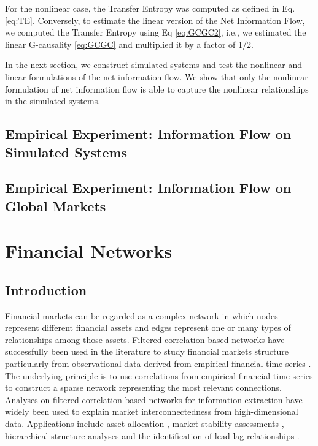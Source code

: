 \documentclass[]{book}
\theoremstyle{definition}
\theoremstyle{definition}
\theoremstyle{definition}
\theoremstyle{remark}
\begin{document}
For the nonlinear case, the Transfer Entropy was computed as defined in
Eq. \eqref{eq:TE}. Conversely, to estimate the linear version of the Net
Information Flow, we computed the Transfer Entropy using Eq
\eqref{eq:GCGC2}, i.e., we estimated the linear G-causality
\eqref{eq:GCGC} and multiplied it by a factor of 1/2.

In the next section, we construct simulated systems and test the
nonlinear and linear formulations of the net information flow. We show
that only the nonlinear formulation of net information flow is able to
capture the nonlinear relationships in the simulated systems.

\section{Empirical Experiment: Information Flow on Simulated
Systems}\label{empirical-experiment-information-flow-on-simulated-systems}

\section{Empirical Experiment: Information Flow on Global
Markets}\label{empirical-experiment-information-flow-on-global-markets}

\chapter{Financial Networks}\label{financial-networks}

\section{Introduction}\label{introduction-3}

Financial markets can be regarded as a complex network in which nodes
represent different financial assets and edges represent one or many
types of relationships among those assets. Filtered correlation-based
networks have successfully been used in the literature to study
financial markets structure particularly from observational data derived
from empirical financial time series
\cite{bardoscia2017pathways, 10.1371/journal.pone.0017994, Mantegna1999, aste2010correlation, Tumminello201040, Tumminello26072005}.
The underlying principle is to use correlations from empirical financial
time series to construct a sparse network representing the most relevant
connections. Analyses on filtered correlation-based networks for
information extraction \cite{song2008analysis,aste2010correlation} have
widely been used to explain market interconnectedness from
high-dimensional data. Applications include asset allocation
\cite{LI2018, pozzi2013spread}, market stability assessments
\cite{morales2012dynamical}, hierarchical structure analyses
\cite{Mantegna1999, aste2010correlation,Tumminello201040, musmeci2014clustering, song2012hierarchical}
and the identification of lead-lag relationships
\cite{curme2015coupled}.
\end{document}
